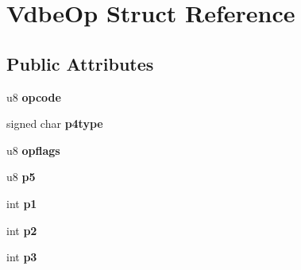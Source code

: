 \hypertarget{struct_vdbe_op}{\section{Vdbe\-Op Struct Reference}
\label{struct_vdbe_op}
}
\subsection*{Public Attributes}
\begin{DoxyCompactItemize}
\item 
\hypertarget{struct_vdbe_op_ae12a8e7a8f5f7ba39fa379c9ad287837}{u8 {\bfseries opcode}}\label{struct_vdbe_op_ae12a8e7a8f5f7ba39fa379c9ad287837}

\item 
\hypertarget{struct_vdbe_op_a124dee58d3e0d73c7dfaf811a3311023}{signed char {\bfseries p4type}}\label{struct_vdbe_op_a124dee58d3e0d73c7dfaf811a3311023}

\item 
\hypertarget{struct_vdbe_op_a169a7bbe99a90c26ee01833723750b1d}{u8 {\bfseries opflags}}\label{struct_vdbe_op_a169a7bbe99a90c26ee01833723750b1d}

\item 
\hypertarget{struct_vdbe_op_a5e807981f52d29c06a5b6d4a8f2f4595}{u8 {\bfseries p5}}\label{struct_vdbe_op_a5e807981f52d29c06a5b6d4a8f2f4595}

\item 
\hypertarget{struct_vdbe_op_a17c8326a1e3ac5612d4aaaa88f383b3b}{int {\bfseries p1}}\label{struct_vdbe_op_a17c8326a1e3ac5612d4aaaa88f383b3b}

\item 
\hypertarget{struct_vdbe_op_aba021fa9d30343c16794d9b76d8bffcd}{int {\bfseries p2}}\label{struct_vdbe_op_aba021fa9d30343c16794d9b76d8bffcd}

\item 
\hypertarget{struct_vdbe_op_ad7ef3319da20d5423b8cc5da6995d193}{int {\bfseries p3}}\label{struct_vdbe_op_ad7ef3319da20d5423b8cc5da6995d193}


\end{DoxyCompactItemize}

